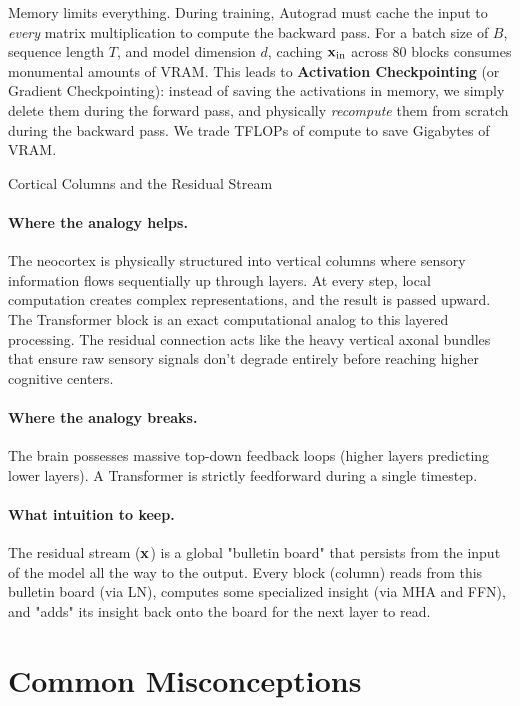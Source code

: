 Memory limits everything. During training, Autograd must cache the input to \emph{every} matrix multiplication to compute the backward pass.
For a batch size of $B$, sequence length $T$, and model dimension $d$, caching $\mathbf{x}_{\text{in}}$ across 80 blocks consumes monumental amounts of VRAM. This leads to \textbf{Activation Checkpointing} (or Gradient Checkpointing): instead of saving the activations in memory, we simply delete them during the forward pass, and physically \emph{recompute} them from scratch during the backward pass. We trade TFLOPs of compute to save Gigabytes of VRAM.

\begin{analogybox}{Cortical Columns and the Residual Stream}
  \paragraph{Where the analogy helps.}
  The neocortex is physically structured into vertical columns where sensory information flows sequentially up through layers. At every step, local computation creates complex representations, and the result is passed upward. The Transformer block is an exact computational analog to this layered processing. The residual connection acts like the heavy vertical axonal bundles that ensure raw sensory signals don't degrade entirely before reaching higher cognitive centers.

  \paragraph{Where the analogy breaks.}
  The brain possesses massive top-down feedback loops (higher layers predicting lower layers). A Transformer is strictly feedforward during a single timestep. 

  \paragraph{What intuition to keep.}
  The residual stream ($\mathbf{x}$) is a global "bulletin board" that persists from the input of the model all the way to the output. Every block (column) reads from this bulletin board (via LN), computes some specialized insight (via MHA and FFN), and "adds" its insight back onto the board for the next layer to read.
\end{analogybox}


\section{Common Misconceptions}
\label{ch:10:sec:misconceptions}

